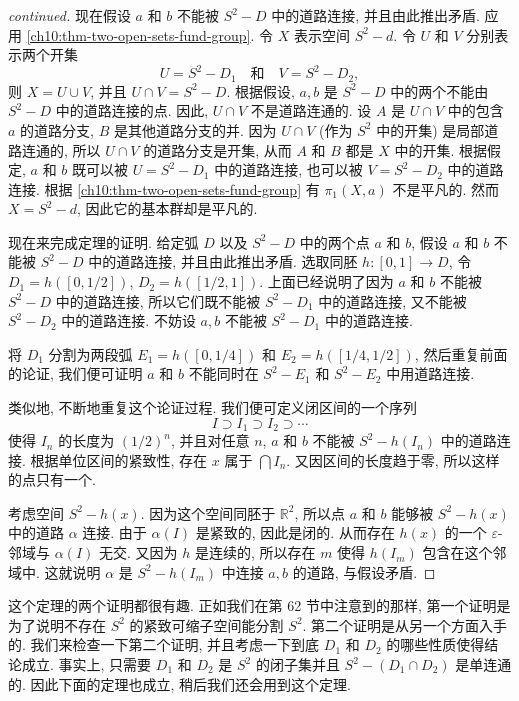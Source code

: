 \begin{proof}[continued]
现在假设 $a$ 和 $b$ 不能被 $S^{2}-D$ 中的道路连接, 并且由此推出矛盾. 应用 \cref{ch10:thm-two-open-sets-fund-group}. 令 $X$ 表示空间 $S^{2}-d$. 令 $U$ 和 $V$ 分别表示两个开集
\[
U=S^{2}-D_{1}\quad\text{和}\quad V=S^{2}-D_{2},
\]
则 $X=U\cup V$, 并且 $U\cap V=S^{2}-D$. 根据假设, $a,b$ 是 $S^{2}-D$ 中的两个不能由 $S^{2}-D$ 中的道路连接的点. 因此, $U\cap V$ 不是道路连通的. 设 $A$ 是 $U\cap V$ 中的包含 $a$ 的道路分支, $B$ 是其他道路分支的并. 因为 $U\cap V$ (作为 $S^{2}$ 中的开集) 是局部道路连通的, 所以 $U\cap V$ 的道路分支是开集, 从而 $A$ 和 $B$ 都是 $X$ 中的开集. 根据假定, $a$ 和 $b$ 既可以被 $U=S^{2}-D_{1}$ 中的道路连接, 也可以被 $V=S^{2}-D_{2}$ 中的道路连接. 根据 \cref{ch10:thm-two-open-sets-fund-group} 有 $\pi_{1}(X,a)$ 不是平凡的. 然而 $X=S^{2}-d$, 因此它的基本群却是平凡的.

现在来完成定理的证明. 给定弧 $D$ 以及 $S^{2}-D$ 中的两个点 $a$ 和 $b$, 假设 $a$ 和 $b$ 不能被 $S^{2}-D$ 中的道路连接, 并且由此推出矛盾. 选取同胚 $h\colon[0,1]\to D$, 令 $D_{1}=h([0,1/2])$, $D_{2}=h([1/2,1])$. 上面已经说明了因为 $a$ 和 $b$ 不能被 $S^{2}-D$ 中的道路连接, 所以它们既不能被 $S^{2}-D_{1}$ 中的道路连接, 又不能被 $S^{2}-D_{2}$ 中的道路连接. 不妨设 $a,b$ 不能被 $S^{2}-D_{1}$ 中的道路连接.

将 $D_{1}$ 分割为两段弧 $E_{1}=h([0,1/4])$ 和 $E_{2}=h([1/4,1/2])$, 然后重复前面的论证, 我们便可证明 $a$ 和 $b$ 不能同时在 $S^{2}-E_{1}$ 和 $S^{2}-E_{2}$ 中用道路连接.

类似地, 不断地重复这个论证过程. 我们便可定义闭区间的一个序列
\[
I\supset I_{1}\supset I_{2}\supset\cdots
\]
使得 $I_{n}$ 的长度为 $(1/2)^{n}$, 并且对任意 $n$, $a$ 和 $b$ 不能被 $S^{2}-h(I_{n})$ 中的道路连接. 根据单位区间的紧致性, 存在 $x$ 属于 $\bigcap I_{n}$. 又因区间的长度趋于零, 所以这样的点只有一个.

考虑空间 $S^{2}-h(x)$. 因为这个空间同胚于 $\mathbb{R}^{2}$, 所以点 $a$ 和 $b$ 能够被 $S^{2}-h(x)$ 中的道路 $\alpha$ 连接. 由于 $\alpha(I)$ 是紧致的, 因此是闭的. 从而存在 $h(x)$ 的一个 $\varepsilon$-邻域与 $\alpha(I)$ 无交. 又因为 $h$ 是连续的, 所以存在 $m$ 使得 $h(I_{m})$ 包含在这个邻域中. 这就说明 $\alpha$ 是 $S^{2}-h(I_{m})$ 中连接 $a,b$ 的道路, 与假设矛盾.
\end{proof}

这个定理的两个证明都很有趣. 正如我们在第 62 节中注意到的那样, 第一个证明是为了说明不存在 $S^{2}$ 的紧致可缩子空间能分割 $S^{2}$. 第二个证明是从另一个方面入手的. 我们来检查一下第二个证明, 并且考虑一下到底 $D_{1}$ 和 $D_{2}$ 的哪些性质使得结论成立. 事实上, 只需要 $D_{1}$ 和 $D_{2}$ 是 $S^{2}$ 的闭子集并且 $S^{2}-(D_{1}\cap D_{2})$ 是单连通的. 因此下面的定理也成立, 稍后我们还会用到这个定理.


